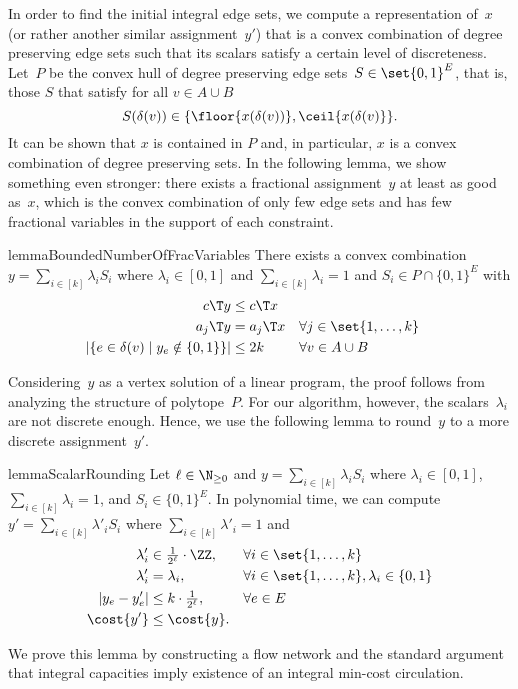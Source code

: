 \documentclass[a4paper,USenglish,cleveref,thm-restate]{lipics-v2021}
\begin{document}
In order to find the initial integral edge sets, we compute a representation of~$x$ (or rather another similar assignment~$y'$) that is a convex
combination of degree preserving edge sets
such that its scalars satisfy
a certain level of discreteness.
Let~$P$ be the convex hull of degree preserving edge sets~$S \in \set{0,1}^E$, that is, those $S$ that satisfy for all $v\in A\cup B$
\begin{equation*}
    S(\delta(v))\in\{\floor{x(\delta(v))}, \ceil{x(\delta(v)}\}.
\end{equation*}
It can be shown that $x$ is contained in $P$ and,
in particular, $x$ is a convex combination of
degree preserving sets. 
In the following lemma, we show something even stronger: there
exists a fractional assignment~$y$ at least
as good as~$x$, which is the
convex combination of only few edge sets
and has few fractional
variables in the support of each constraint.

\begin{restatable}{lemma}{BoundedNumberOfFracVariables}
    \label{lem:bounded-number-of-frac-variables}
    There exists a convex combination $y = \sum_{i \in [k]} \lambda_i S_i$
    where $\lambda_i \in [0,1]$ and $\sum_{i \in [k]} \lambda_i = 1$ and $S_i \in P \cap \{0,1\}^E$ with
    \begin{align}
        c\T y &\le c\T x & \\
        a_j\T y &= a_j\T x &&\forall j \in \set{1,\dotsc,k} \\
        |\{e\in \delta(v) \mid y_e \notin \{0, 1\}\}| &\le 2k &&\forall v\in A\cup B & \label{eq:sos-bounded-support}
    \end{align}
\end{restatable}
Considering~$y$ as a vertex solution of a linear program, the proof follows from analyzing the structure of polytope~$P$.
For our algorithm, however, the scalars~$\lambda_i$ are not discrete enough.
Hence, we use the following lemma to round~$y$ to a more discrete assignment~$y'$.

\begin{restatable}{lemma}{ScalarRounding}
    \label{lem:convex-represenation-scalar-rounding}
    Let $\ell\in\N_{\ge 0}$ 
    and $y = \sum_{i \in [k]} \lambda_i S_i$ where $\lambda_i \in [0,1]$, $\sum_{i \in [k]} \lambda_i = 1$, and $S_i \in \{0,1\}^E$.
    In polynomial time, we can compute $y' = \sum_{i \in [k]} \lambda'_i S_i$ where $\sum_{i \in [k]} \lambda'_i = 1$ and
    \begin{align}
        \lambda'_i &\in \tfrac{1}{2^{\ell}}\cdot \ZZ, &&  \forall i \in \set{1, \dotsc, k} \label{eq:integer-multiples}\\
        \lambda'_i &= \lambda_i, &&  \forall i \in \set{1, \dotsc, k}, \lambda_i\in\{0,1\} \\
        |y_e - y_e'| &\le k \cdot \tfrac{1}{2^\ell}, &&  \forall e \in E \label{eq:close-solution}\\
        \cost{y'} &\le \cost{y}. \label{eq:rounding-cost-preservation}
    \end{align}
\end{restatable}
We prove this lemma by constructing a flow network and
the standard argument that integral capacities imply existence of an integral min-cost circulation.
\end{document}
